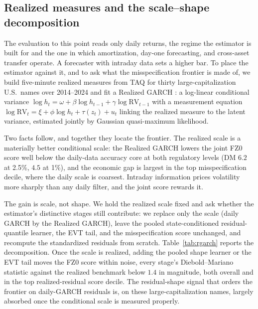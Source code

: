\documentclass[11pt]{article}
\theoremstyle{remark}
\begin{document}
\subsection{Realized measures and the scale--shape decomposition}
\label{sec:rgarch}
The evaluation to this point reads only daily returns, the regime the estimator is
built for and the one in which amortization, day-one forecasting, and cross-asset
transfer operate. A forecaster with intraday data sets a higher bar. To place the
estimator against it, and to ask what the misspecification frontier is made of, we
build five-minute realized measures from TAQ for thirty large-capitalization U.S.\
names over 2014--2024 and fit a Realized GARCH \citep{hansen2012realized}: a
log-linear conditional variance $\log h_t=\omega+\beta\log h_{t-1}+\gamma\log
\mathrm{RV}_{t-1}$ with a measurement equation $\log\mathrm{RV}_t=\xi+\phi\log
h_t+\tau(z_t)+u_t$ linking the realized measure to the latent variance, estimated
jointly by Gaussian quasi-maximum likelihood.

Two facts follow, and together they locate the frontier. The realized scale is a
materially better conditional scale: the Realized GARCH lowers the joint FZ0 score
well below the daily-data accuracy core at both regulatory levels (DM $6.2$ at
2.5\%, $4.5$ at 1\%), and the economic gap is largest in the top misspecification
decile, where the daily scale is coarsest. Intraday information prices volatility
more sharply than any daily filter, and the joint score rewards it.

The gain is scale, not shape. We hold the realized scale fixed and ask whether the
estimator's distinctive stages still contribute: we replace only the scale (daily
GARCH by the Realized GARCH), leave the pooled state-conditioned residual-quantile
learner, the EVT tail, and the misspecification score unchanged, and recompute the
standardized residuals from scratch. Table~\ref{tab:rgarch} reports the
decomposition. Once the scale is realized, adding the pooled shape learner or the
EVT tail moves the FZ0 score within noise, every stage's Diebold--Mariano statistic
against the realized benchmark below $1.4$ in magnitude, both overall and in the top
realized-residual score decile. The
residual-shape signal that orders the frontier on daily-GARCH residuals is, on
these large-capitalization names, largely absorbed once the conditional scale is
measured properly.
\end{document}
